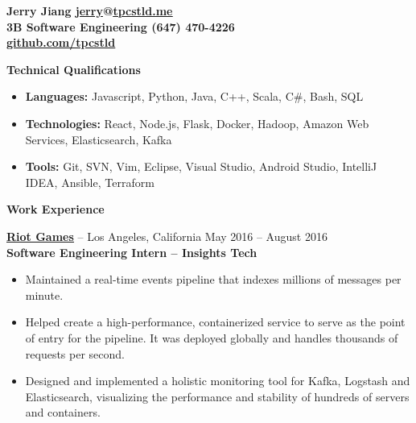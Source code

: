 \documentclass{letter}
\begin{document}
  \thispagestyle{empty}


{\bfseries
  {\Large Jerry Jiang} \hfill \href{mailto:jerry@tpcstld.me}{\uline{jerry}}@\href{http://tpcstld.me}{\uline{tpcstld.me}} \\
  3B Software Engineering \hfill (647) 470-4226 \\
\null \hfill \href{https://github.com/tpcstld}{\uline{github.com/tpcstld}}} \\
\null \hrulefill

{\bfseries \Large Technical Qualifications}
\vspace{-3mm}
\begin{itemize}
    \item {\bfseries Languages:}
        Javascript, Python, Java, C++, Scala, C\#, Bash, SQL
    \item {\bfseries Technologies:}
        React, Node.js, Flask, Docker, Hadoop, Amazon Web Services,
        Elasticsearch, Kafka
    \item {\bfseries Tools:}
        Git, SVN, Vim, Eclipse, Visual Studio, Android Studio, IntelliJ IDEA,
        Ansible, Terraform
\end{itemize}

{\bfseries \Large Work Experience}

\vspace{-1.5mm}
{\bfseries \href{https://riotgames.com}{\uline{Riot Games}}} -- Los Angeles,
California \hfill May 2016 -- August 2016\\
{\bfseries Software Engineering Intern -- Insights Tech}
\vspace{-3mm}
\begin{itemize}
    \item Maintained a real-time events pipeline that indexes millions of
      messages per minute.
    \item Helped create a high-performance, containerized service to serve as the
      point of entry for the pipeline. It was deployed globally and handles
      thousands of requests per second.
    \item Designed and implemented a holistic monitoring tool for Kafka,
      Logstash and Elasticsearch, visualizing the performance and
      stability of hundreds of servers and containers.
\end{itemize}
\end{document}
